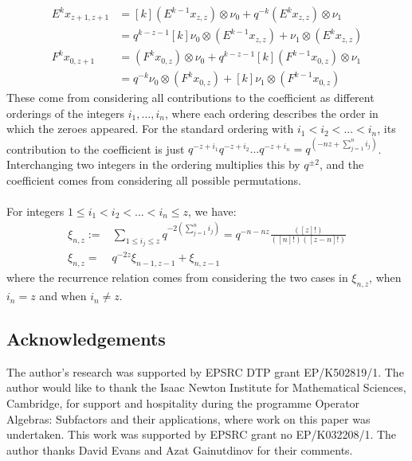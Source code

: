 \documentclass[]{article}
\begin{document}
\begin{appendices}
\begin{align}
E^{k}x_{z+1,z+1}&=[k](E^{k-1}x_{z,z})\otimes\nu_{0}+q^{-k}(E^{k}x_{z,z})\otimes\nu_{1} \label{eq:A13}\\
&=q^{k-z-1}[k]\nu_{0}\otimes(E^{k-1}x_{z,z})+\nu_{1}\otimes(E^{k}x_{z,z}) \label{eq:A14}\\
F^{k}x_{0,z+1}&=(F^{k}x_{0,z})\otimes\nu_{0}+q^{k-z-1}[k](F^{k-1}x_{0,z})\otimes\nu_{1} \label{eq:A15}\\
&=q^{-k}\nu_{0}\otimes(F^{k}x_{0,z})+[k]\nu_{1}\otimes(F^{k-1}x_{0,z}) \label{eq:A16}
\end{align}
These come from considering all contributions to the coefficient as different orderings of the integers $i_{1},...,i_{n}$, where each ordering describes the order in which the zeroes appeared. For the standard ordering with $i_{1}<i_{2}<...<i_{n}$, its contribution to the coefficient is just $q^{-z+i_{1}}q^{-z+i_{2}}...q^{-z+i_{n}}=q^{(-nz+\sum\limits_{j=1}^{n}i_{j})}$. Interchanging two integers in the ordering multiplies this by $q^{\pm 2}$, and the coefficient comes from considering all possible permutations.\\
\\
For  integers $1\leq i_{1}<i_{2}<...<i_{n}\leq z$, we have:
\begin{align}
\xi_{n,z}:=&\sum\limits_{1\leq i_{j}\leq z}q^{-2(\sum\limits_{j=1}^{n}i_{j})}=q^{-n-nz}\frac{([z]!)}{([n]!)([z-n]!)} \label{eq:A17}\\
\xi_{n,z}=& q^{-2z}\xi_{n-1,z-1}+\xi_{n,z-1}
\end{align}
where the recurrence relation comes from considering the two cases in $\xi_{n,z}$, when $i_{n}=z$ and when $i_{n}\neq z$.  
\end{appendices}
\subsection*{Acknowledgements}
The author's research was supported by EPSRC DTP grant EP/K502819/1. The author would like to thank the Isaac Newton Institute for Mathematical Sciences, Cambridge, for support and hospitality during the programme Operator Algebras: Subfactors and their applications, where work on this paper was undertaken. This work was supported by EPSRC grant no EP/K032208/1. The author thanks David Evans and Azat Gainutdinov for their comments.
\end{document}

